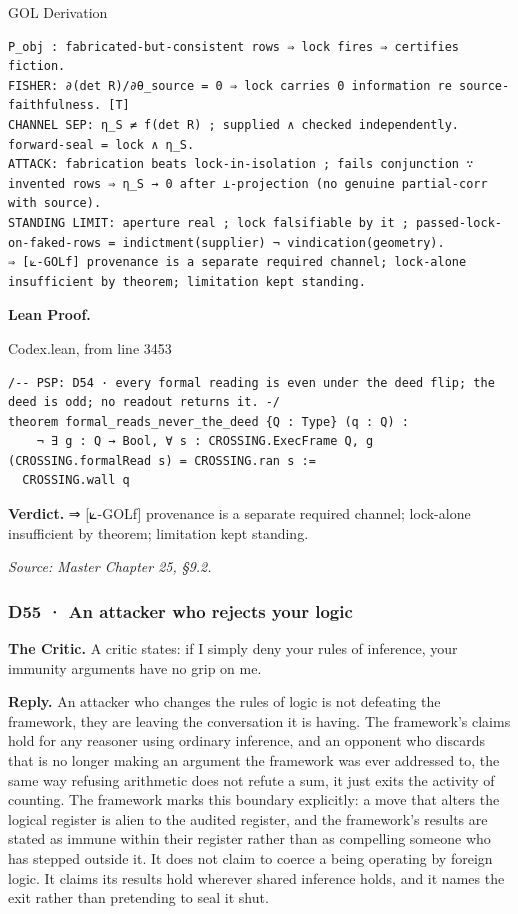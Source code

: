 \documentclass[10pt,twocolumn]{article}
\begin{document}
\begin{golbox}{GOL Derivation}
\begin{lstlisting}[style=golv]
P_obj : fabricated-but-consistent rows ⇒ lock fires ⇒ certifies fiction.
FISHER: ∂(det R)/∂θ_source = 0 ⇒ lock carries 0 information re source-faithfulness. [T]
CHANNEL SEP: η_S ≠ f(det R) ; supplied ∧ checked independently. forward-seal = lock ∧ η_S.
ATTACK: fabrication beats lock-in-isolation ; fails conjunction ∵ invented rows ⇒ η_S → 0 after ⊥-projection (no genuine partial-corr with source).
STANDING LIMIT: aperture real ; lock falsifiable by it ; passed-lock-on-faked-rows = indictment(supplier) ¬ vindication(geometry).
⇒ [⟀-GOLf] provenance is a separate required channel; lock-alone insufficient by theorem; limitation kept standing.
\end{lstlisting}
\end{golbox}

\textbf{Lean Proof.}

\begin{leanexcerpt}{Codex.lean, from line 3453}
\begin{lstlisting}[style=leanx,firstnumber=3453]
/-- PSP: D54 · every formal reading is even under the deed flip; the deed is odd; no readout returns it. -/
theorem formal_reads_never_the_deed {Q : Type} (q : Q) :
    ¬ ∃ g : Q → Bool, ∀ s : CROSSING.ExecFrame Q, g (CROSSING.formalRead s) = CROSSING.ran s :=
  CROSSING.wall q
\end{lstlisting}
\end{leanexcerpt}

\textbf{Verdict.} ⇒ {[}⟀-GOLf{]} provenance is a separate required
channel; lock-alone insufficient by theorem; limitation kept standing.

\emph{Source: Master Chapter 25, §9.2.}

\hypertarget{d55-an-attacker-who-rejects-your-logic}{%
\subsubsection{D55 · An attacker who rejects your
logic}\label{d55-an-attacker-who-rejects-your-logic}}

\textbf{The Critic.} A critic states: if I simply deny your rules of
inference, your immunity arguments have no grip on me.

\textbf{Reply.} An attacker who changes the rules of logic is not
defeating the framework, they are leaving the conversation it is having.
The framework's claims hold for any reasoner using ordinary inference,
and an opponent who discards that is no longer making an argument the
framework was ever addressed to, the same way refusing arithmetic does
not refute a sum, it just exits the activity of counting. The framework
marks this boundary explicitly: a move that alters the logical register
is alien to the audited register, and the framework's results are stated
as immune within their register rather than as compelling someone who
has stepped outside it. It does not claim to coerce a being operating by
foreign logic. It claims its results hold wherever shared inference
holds, and it names the exit rather than pretending to seal it shut.
\end{document}
